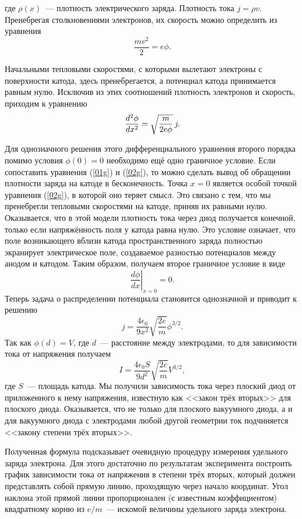 где $\rho(x)$~--- плотность электрического заряда. Плотность тока $j=\rho v$. Пренебрегая столкновениями электронов, их скорость можно определить из уравнения
$$
\frac{mv^2}{2}=e\phi.
$$

Начальными тепловыми скоростями, с которыми вылетают электроны с поверхности катода, здесь пренебрегается, а потенциал катода принимается равным нулю. Исключив из этих соотношений плотность электронов и скорость, приходим к уравнению
\begin{equation}
	\eqmark{02g}
	\frac{d^2\phi}{dx^2}=\sqrt{\frac{m}{2e\phi}}\, j.
\end{equation}

Для однозначного решения этого дифференциального уравнения второго порядка помимо условия $\phi(0)=0$ необходимо ещё одно граничное условие. Если сопоставить уравнения (\eqref{01g}) и (\eqref{02g}), то можно сделать вывод об обращении плотности заряда на катоде в бесконечность. Точка $x=0$ является особой точкой уравнения (\eqref{02g}), в которой оно теряет смысл.
Это связано с тем, что мы пренебрегли тепловыми скоростями на катоде, приняв их равными нулю. Оказывается, что в этой модели плотность тока через диод получается конечной, только если напряжённость поля у катода равна нулю. Это условие означает, что поле возникающего вблизи катода пространственного заряда полностью экранирует электрическое поле, создаваемое разностью потенциалов между анодом и катодом. Таким образом, получаем второе граничное условие в виде
$$
\left.\frac{d\phi}{dx}\right|_{x = 0}=0.
$$
Теперь задача о распределении потенциала становится однозначной и приводит к решению
$$
j=\frac{4\epsilon_0}{9x^2}\sqrt{\frac{2e}{m}}\phi^{3/2}.
$$
Так как $\phi(d)=V$, где $d$~--- расстояние между электродами, то для зависимости тока от напряжения получаем
$$
I=\frac{4\epsilon_0 S}{9d^2}\sqrt{\frac{2e}{m}}V^{3/2},
$$
где $S$~--- площадь катода. Мы получили зависимость тока через плоский диод от приложенного к нему напряжения, известную как <<закон трёх вторых>> для плоского диода. Оказывается, что не только для плоского вакуумного диода, а и для вакуумного диода с электродами любой другой геометрии ток подчиняется <<закону степени трёх вторых>>.

Полученная формула подсказывает очевидную процедуру измерения удельного заряда электрона. Для этого достаточно по
результатам эксперимента построить график зависимости тока от напряжения в степени трёх вторых, который должен
представлять собой прямую линию, проходящую через начало координат. Угол наклона этой прямой линии пропорционален (с известным коэффициентом) квадратному корню из $e/m$~--- искомой величины удельного заряда электрона.

